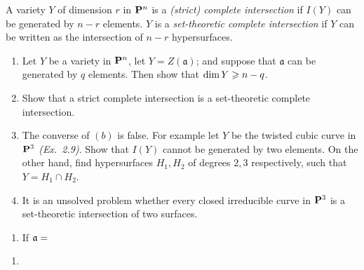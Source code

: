 \documentclass[10pt]{amsart}
\begin{document}
\begin{exercise}[2.17]
    A variety $Y$ of dimension $r$ in ${\bf P}^n$ is a \emph{(strict) complete
    intersection} if $I(Y)$ can be generated by $n-r$ elements. $Y$ is a
    \emph{set-theoretic complete intersection} if $Y$ can be written as the
    intersection of $n-r$ hypersurfaces.
    \begin{enumerate}
    \item Let $Y$ be a variety in ${\bf P}^n$, let $Y = Z(\mathfrak{a})$; and
    suppose that $\mathfrak{a}$ can be generated by $q$ elements. Then show
    that $\operatorname{\rm{dim}} Y \geqslant n-q$. 
    \item Show that a strict complete intersection is a set-theoretic complete
    intersection.
    \item The converse of $(b)$ is false. For example let $Y$ be the twisted
    cubic curve in ${\bf P}^3$ {\emph{(Ex.\ 2.9)}}. Show that
    $I(Y)$ cannot be generated by two elements. On the other hand, find
    hypersurfaces $H_1,H_2$ of degrees $2,3$ respectively, such that
    $Y = H_1 \cap H_2$. 
    \item It is an unsolved problem whether every closed irreducible curve in
    ${\bf P}^3$ is a set-theoretic intersection of two surfaces.
    \end{enumerate}
\end{exercise}

\begin{solution}
\begin{enumerate}
    \item If $\mathfrak{a} = $
\end{enumerate}
\end{solution}

\begin{exercise}[3.15]
\end{exercise}

\begin{solution}
    \begin{enumerate}
        \item {}
    \end{enumerate}
\end{solution}
\end{document}
